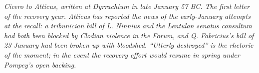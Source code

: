 
\textit{Cicero to Atticus, written at Dyrrachium in late
January 57 BC. The first letter of the recovery year. Atticus
has reported the news of the early-January attempts at the
recall: a tribunician bill of L. Ninnius and the Lentulan
senatus consultum had both been blocked by Clodian violence
in the Forum, and Q. Fabricius's bill of 23 January had been
broken up with bloodshed. ``Utterly destroyed'' is the rhetoric
of the moment; in the event the recovery effort would resume in
spring under Pompey's open backing.}
